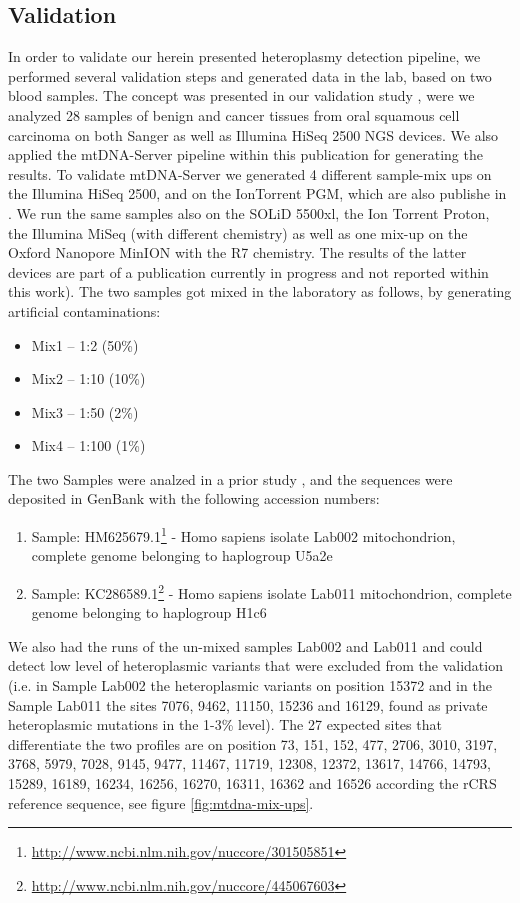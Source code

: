 \subsection{Validation}
In order to validate our herein presented heteroplasmy detection pipeline, we performed several validation steps and generated data in the lab, based on two blood samples. The concept was presented in our validation study \cite{Kloss-Brandstatter2015}, were we analyzed 28 samples of benign and cancer tissues from oral squamous cell carcinoma on both Sanger as well as Illumina HiSeq 2500 NGS devices. We also applied the mtDNA-Server pipeline within this publication for generating the results. To validate mtDNA-Server we generated 4 different sample-mix ups on the Illumina HiSeq 2500, and on the IonTorrent
PGM, which are also publishe in \cite{Weissensteiner2016b,Kloss-Brandstatter2015}. We run the same samples also on the SOLiD 5500xl, the Ion Torrent Proton, the Illumina MiSeq (with different chemistry) as well as one mix-up on the Oxford Nanopore MinION with the R7 chemistry. The results of the latter devices are part of a publication currently in progress and not reported within this work). The two samples got mixed in the laboratory as follows, by generating artificial contaminations: 
\begin{itemize}
\item Mix1 – 1:2 (50\%) 
\item Mix2 – 1:10 (10\%) 
\item Mix3 – 1:50 (2\%) 
\item Mix4 – 1:100 (1\%)
\end{itemize}
The two Samples were analzed in a prior study \cite{KlossBrandstatter2010}, and the sequences were deposited in GenBank with the following accession numbers:
\begin{enumerate}
\item Sample: HM625679.1\footnote{\url{http://www.ncbi.nlm.nih.gov/nuccore/301505851}} - Homo sapiens isolate Lab002 mitochondrion, complete genome  belonging to haplogroup U5a2e
\item Sample: KC286589.1\footnote{\url{http://www.ncbi.nlm.nih.gov/nuccore/445067603}} - Homo sapiens isolate Lab011 mitochondrion, complete genome  belonging to haplogroup H1c6
\end{enumerate}
We also had the runs of the un-mixed samples Lab002 and Lab011 and could detect low level of heteroplasmic variants that were excluded from the validation (i.e. in Sample Lab002 the heteroplasmic variants on position  15372 and in the Sample Lab011 the sites 7076, 9462, 11150, 15236 and 16129, found as private heteroplasmic mutations in the 1-3\% level). The 27 expected sites that differentiate the two profiles are on position 73, 151, 152, 477, 2706, 3010, 3197, 3768, 5979, 7028, 9145, 9477, 11467, 11719,
12308, 12372, 13617, 14766, 14793, 15289, 16189, 16234, 16256, 16270, 16311, 16362 and 16526 according the rCRS reference sequence, see figure \ref{fig:mtdna-mix-ups}. 

